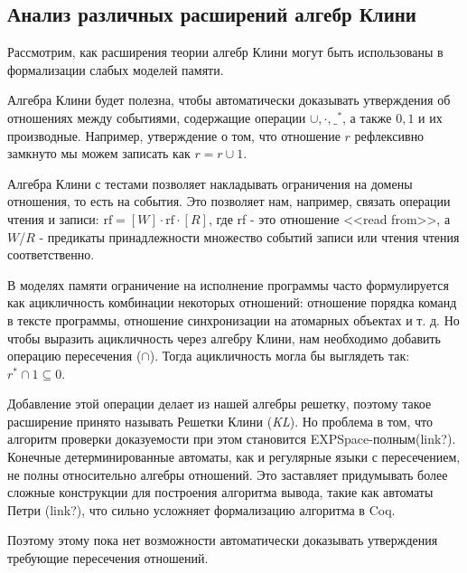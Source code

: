 \documentclass[times
              ]{itmo-student-thesis}
\begin{document}
  \subsection{Анализ различных расширений алгебр Клини}
    Рассмотрим, как расширения теории алгебр Клини могут быть использованы в формализации слабых моделей памяти.

    Алгебра Клини будет полезна, чтобы автоматически доказывать утверждения об отношениях между событиями,
    содержащие операции $ \cup, \cdot, \_^* $, а также $0, 1 $ и их производные.
    Например, утверждение о том, что отношение $ r $ рефлексивно замкнуто мы можем записать как $ r = r \cup 1 $.

    Алгебра Клини с тестами позволяет накладывать ограничения на домены отношения, то есть на события. Это позволяет нам, например, связать операции чтения и записи:
    $ \text{rf} = [W] \cdot \text{rf} \cdot [R] $,
      где rf - это отношение <<read from>>,
      а $W$/$R$ - предикаты принадлежности множество событий записи или чтения чтения соответственно.


    В моделях памяти ограничение на исполнение программы часто формулируется как ацикличность комбинации некоторых отношений: отношение порядка команд в тексте программы, отношение синхронизации на атомарных объектах и т. д.
    Но чтобы выразить ацикличность через алгебру Клини, нам необходимо добавить операцию пересечения ($\cap$).
    Тогда ацикличность могла бы выглядеть так: $ r^* \cap 1 \subseteq 0 $.

    Добавление этой операции делает из нашей алгебры решетку, поэтому такое расширение принято называть Решетки Клини (\textit{KL}).
    Но проблема в том, что алгоритм проверки доказуемости при этом становится EXPSpace-полным(link?).
    Конечные детерминированные автоматы, как и регулярные языки с пересечением, не полны относительно алгебры отношений.
    Это заставляет придумывать более сложные конструкции для построения алгоритма вывода, такие как автоматы Петри (link?), что сильно усложняет формализацию алгоритма в Coq.

    Поэтому этому пока нет возможности автоматически доказывать утверждения требующие пересечения отношений.
\end{document}
